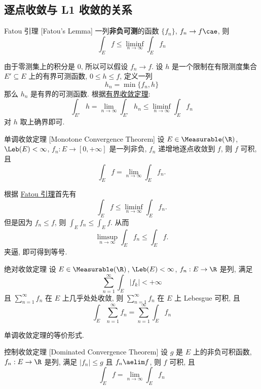 \subsection{逐点收敛与 L1 收敛的关系}
\begin{thm}
    [fatou]
    {Fatou 引理}
    [Fatou's Lemma]
    一列\textbf{非负可测}的函数 \(\{f_n\}\), \(f_n\to f\cae\), 则 
    \[\int_E f \leq \liminf_{n\to\infty} \int_E f_n\]
\end{thm}
\begin{prf}
    由于零测集上的积分是 0, 所以可以假设 \(f_n\to f\). 设 \(h\) 是一个限制在有限测度集合 \(E'\subseteq E\) 上的有界可测函数, \(0\leq h\leq f\), 定义一列
    \[h_n=\min\{f_n, h\}\]
    那么 \(h_n\) 是有界的可测函数. 根据\hyperref[thm:bct]{有界收敛定理}:
    \[\int_{E'} h = \lim_{n\to\infty} \int_{E'} h_n\leq\liminf_{n\to\infty} \int_E f_n \]
    对 \(h\) 取上确界即可.
\end{prf}
\begin{thm}
    [mct]
    {单调收敛定理}
    [Monotone Convergence Theorem]
    设 $E\in\Measurable(\R)$, \(\Leb(E)<\infty\), \(f_n:E\to[0,+\infty]\) 是一列非负\MeasurableFunc{}, \(f_n\) 递增地逐点收敛到 \(f\), 则 \(f\) 可积, 且\
    \[\int_E f = \lim_{n\to\infty} \int_E f_n.\]
\end{thm}
\begin{prf}
    根据 \hyperref[thm:fatou]{Fatou 引理}首先有
    \[\int_E f \leq \liminf_{n\to\infty} \int_E f_n.\]
    但是因为 \(f_n\leq f\), 则 \(\int_E f_n \leq \int_E f\). 从而
    \[\limsup_{n\to\infty} \int_E f_n \leq \int_E f.\]
    夹逼, 即可得到等号.
\end{prf}
\begin{thm}
    {绝对收敛定理}
    设 $E\in\Measurable(\R)$, \(\Leb(E)<\infty\), \(f_n:E\to\R\) 是\MeasurableFunc{}列, 满足 
    \[\sum_{n=1}^{\infty} \int_{E} |f_k|<+\infty\]
    且 \(\sum_{n=1}^{\infty} f_n\) 在 \(E\) 上几乎处处收敛, 则 \(\sum_{n=1}^{\infty} f_n\) 在 \(E\) 上 Lebesgue 可积, 且
    \[\int_E \sum_{n=1}^{\infty} f_n = \sum_{n=1}^{\infty} \int_E f_n\]
\end{thm}
\begin{prf}
    单调收敛定理的等价形式.
\end{prf}
\begin{thm}
    [dct]
    {控制收敛定理}
    [Dominated Convergence Theorem]
    设 \(g\) 是 \(E\) 上的非负可积函数, \(f_n:E\to\R\) 是\MeasurableFunc{}列, 满足 \(|f_n|\leq g\) 且 \(f_n\aelim f\), 则 \(f\) 可积, 且
    \[\int_E f = \lim_{n\to\infty} \int_E f_n\]
\end{thm}

